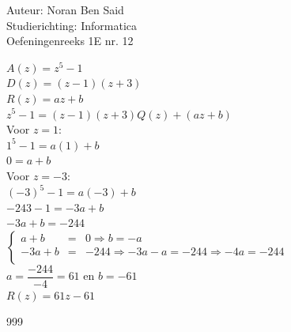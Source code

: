 \documentclass[a4paper]{article}
\begin{document}
\noindent \large Auteur: Noran Ben Said\\
\noindent \large Studierichting: Informatica\\
\noindent \large Oefeningenreeks 1E nr. 12\\

\medskip
\normalsize


$ A(z) = z^5 - 1$\\

$ D(z) = (z - 1)(z + 3)$\\

$ R(z) = az + b$\\

$ z^5 - 1 = (z - 1)(z + 3)Q(z) + (az + b)$\\

Voor $z = 1$:\\

$ 1^5 - 1 = a(1) + b$\\

$ 0 = a + b$\\

Voor $z = -3$:\\

$ (-3)^5 - 1 = a(-3) + b$\\

$ -243 - 1 = -3a + b$\\

$ -3a + b = -244$\\

$\left\{
\begin{array}{lll}
a + b &=& 0 \Rightarrow b=-a\\
-3a + b &=& -244 \Rightarrow -3a - a=-244 \Rightarrow -4a = -244\\
\end{array}
\right.$\\

$ a =\dfrac{-244}{-4} = 61$ en $ b = -61$\\

$ R(z) = 61z - 61$\\


\begin{thebibliography}{999}
\end{thebibliography}
\end{document}
